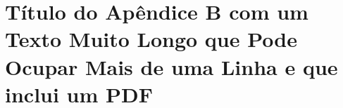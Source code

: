 
\chapter[Versão curta do título]{Título do Apêndice B com um Texto Muito Longo que Pode Ocupar Mais de uma Linha e que inclui um PDF}
\label{cap:apendicea}

